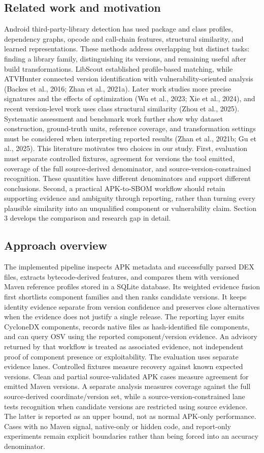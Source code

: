 \documentclass[10pt,twocolumn]{article}
\begin{document}
\subsection{Related work and motivation}
Android third-party-library detection has used package and class profiles, dependency graphs, opcode and call-chain features, structural similarity, and learned representations. These methods address overlapping but distinct tasks: finding a library family, distinguishing its versions, and remaining useful after build transformations. LibScout established profile-based matching, while ATVHunter connected version identification with vulnerability-oriented analysis (Backes et al., 2016; Zhan et al., 2021a). Later work studies more precise signatures and the effects of optimization (Wu et al., 2023; Xie et al., 2024), and recent version-level work uses class structural similarity (Zhou et al., 2025). Systematic assessment and benchmark work further show why dataset construction, ground-truth units, reference coverage, and transformation settings must be considered when interpreting reported results (Zhan et al., 2021b; Gu et al., 2025).
This literature motivates two choices in our study. First, evaluation must separate controlled fixtures, agreement for versions the tool emitted, coverage of the full source-derived denominator, and source-version-constrained recognition. These quantities have different denominators and support different conclusions. Second, a practical APK-to-SBOM workflow should retain supporting evidence and ambiguity through reporting, rather than turning every plausible similarity into an unqualified component or vulnerability claim. Section 3 develops the comparison and research gap in detail.
\subsection{Approach overview}
The implemented pipeline inspects APK metadata and successfully parsed DEX files, extracts bytecode-derived features, and compares them with versioned Maven reference profiles stored in a SQLite database. Its weighted evidence fusion first shortlists component families and then ranks candidate versions. It keeps identity evidence separate from version confidence and preserves close alternatives when the evidence does not justify a single release. The reporting layer emits CycloneDX components, records native files as hash-identified file components, and can query OSV using the reported component/version evidence. An advisory returned by that workflow is treated as associated evidence, not independent proof of component presence or exploitability.
The evaluation uses separate evidence lanes. Controlled fixtures measure recovery against known expected versions. Clean and partial source-validated APK cases measure agreement for emitted Maven versions. A separate analysis measures coverage against the full source-derived coordinate/version set, while a source-version-constrained lane tests recognition when candidate versions are restricted using source evidence. The latter is reported as an upper bound, not as normal APK-only performance. Cases with no Maven signal, native-only or hidden code, and report-only experiments remain explicit boundaries rather than being forced into an accuracy denominator.
\end{document}
